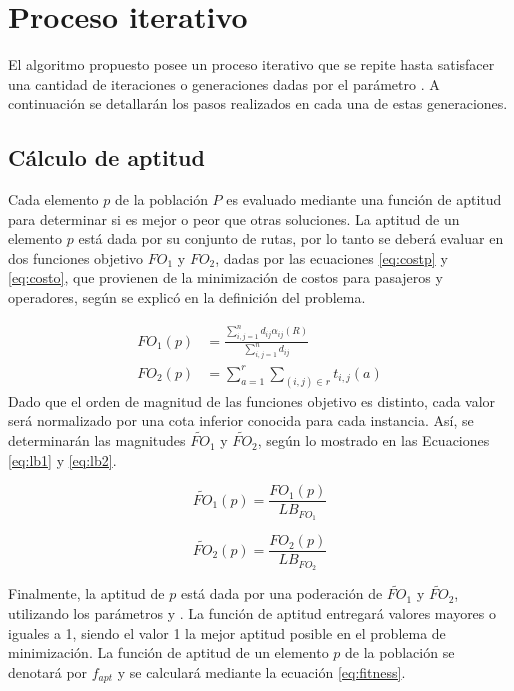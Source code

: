 \section{Proceso iterativo}

El algoritmo propuesto posee un proceso iterativo que se repite hasta satisfacer una cantidad de iteraciones o generaciones dadas por el parámetro \generaciones. A continuación se detallarán los pasos realizados en cada una de estas generaciones.

\subsection{Cálculo de aptitud}

Cada elemento $p$ de la población $P$ es evaluado mediante una función de aptitud para determinar si es mejor o peor que otras soluciones. La aptitud de un elemento $p$ está dada por su conjunto de rutas, por lo tanto se deberá evaluar en dos funciones objetivo $FO_1$ y $FO_2$, dadas por las ecuaciones \eqref{eq:costp} y \eqref{eq:costo}, que provienen de la minimización de costos para pasajeros y operadores, según se explicó en la definición del problema.

\begin{align}
\label{eq:costp}
FO_1(p) &= \frac{\sum^n_{i,j=1}d_{ij}\alpha_{ij}(R)}{\sum_{i,j=1}^{n}d_{ij}}\\
\label{eq:costo}
FO_2(p) &= \sum^r_{a=1}\sum_{(i,j) \in r} t_{i,j} (a)
\end{align}
Dado que el orden de magnitud de las funciones objetivo es distinto, cada valor será normalizado por una cota inferior conocida para cada instancia. Así, se determinarán las magnitudes $\tilde{FO}_1$ y $\tilde{FO}_2$, según lo mostrado en las Ecuaciones \eqref{eq:lb1} y \eqref{eq:lb2}.

\begin{equation}
\label{eq:lb1}
\tilde{FO}_1(p) = \frac{FO_1(p)}{LB_{FO_1}}
\end{equation}

\begin{equation}
\label{eq:lb2}
\tilde{FO}_2(p) = \frac{FO_2(p)}{LB_{FO_2}}
\end{equation}

Finalmente, la aptitud de $p$ está dada por una poderación de $\tilde{FO}_1$ y $\tilde{FO}_2$, utilizando los parámetros \alp{} y \bet. La función de aptitud entregará valores mayores o iguales a 1, siendo el valor 1 la mejor aptitud posible en el problema de minimización. La función de aptitud de un elemento $p$ de la población se denotará por $f_{apt}$ y se calculará mediante la ecuación \eqref{eq:fitness}.

